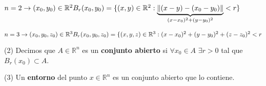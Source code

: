 \documentclass[12pt, titlepage]{article}
\begin{document}
\vspace{5mm}
\noindent
$n=2 \rightarrow (x_0, y_0) \in \mathbb{R}^2 \\ B_r (x_0, y_0) = \{ (x, y) \in \mathbb{R}^2 : \underbrace{\|(x-y) - (x_0 - y_0) \|}_{(x-x_0)^2 + (y - y_0)^2} < r\}$

\noindent
$n=3 \rightarrow (x_0, y_0, z_0) \in \mathbb{R}^3 \\
B_r (x_0, y_0, z_0) = \{ (x, y, z) \in \mathbb{R}^3 : (x-x_0)^2 + (y - y_0)^2 + (z - z_0)^2 < r$

\vspace{5mm}
\noindent
(2) Decimos que $A \in \mathbb{R}^n$ es un \textbf{conjunto abierto} si $\forall x_0 \in A \, \, \exists r>0$ tal que $B_r (x_0) \subset A$.

\vspace{5mm}
\noindent
(3) Un \textbf{entorno} del punto $x \in \mathbb{R}^n$ es un conjunto abierto que lo contiene.

\end{document}
